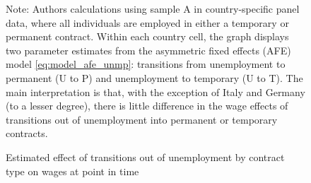 \begin{figure}
    \caption{Estimated effect of transitions out of unemployment by contract type on wages at point in time}
    \label{graph_unmp}
    \footnotesize{Note: Authors calculations using sample A in country-specific panel data, where all individuals are employed in either a temporary or permanent contract.  Within each country cell, the graph displays two parameter estimates from the asymmetric fixed effects (AFE) model \ref{eq:model_afe_unmp}: transitions from unemployment to permanent (U to P) and unemployment to temporary (U to T).  The main interpretation is that, with the exception of Italy and Germany (to a lesser degree), there is little difference in the wage effects of transitions out of unemployment into permanent or temporary contracts.}
\end{figure}

